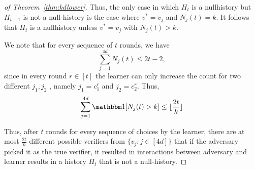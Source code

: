 \documentclass[anon]{alt2027} %
\begin{document}
\begin{proof}[of Theorem~\ref{thm:kdlower}]
Thus, the only case in which $H_t$ is a nullhistory but $H_{t+1}$ is not a null-history is the case where
$v^* = v_j$ and $ N_j(t) = k $.
It follows that $H_t$ is a nullhistory unless $v^* =v_j$ with $N_j(t) >k$.



We note that for every sequence of $t$ rounds, we have
\[
\sum_{j=1}^{4d} N_j(t) \leq 2t-2,
\]
since in every round $r \in [t]$ the learner can only increase the count for two different $j_1,j_2$ , namely $j_1= c_1^r$ and $j_2 = c_2^r$. 
Thus,
\[
\sum_{j=1}^{4d} \indct[N_j(t) > k] \leq \lfloor \frac{2t}{k} \rfloor
\]

Thus, after $t$ rounds for every sequence of choices by the learner, there are at most $\frac{2t}{k}$ different possible verifiers from $\{v_j: j\in [4d]\}$ that if the adversary picked it as the true verifier, it resulted in interactions between adversary and learner results in a history $H_t$ that is not a null-history.


\end{proof}
\end{document}
